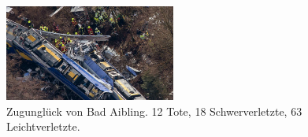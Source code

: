 \begin{frame}
	\begin{examples}
		\begin{figure}
			\begin{center}
				\includegraphics[width=0.5\textwidth]{images/bad-aibling.jpg}
			\end{center}
			\caption{Zugunglück von Bad Aibling. 12 Tote, 18 Schwerverletzte, 63 Leichtverletzte.\cite{manv-badaibling}}\label{fig:badaibling}
		\end{figure}
	\end{examples}
\end{frame}
